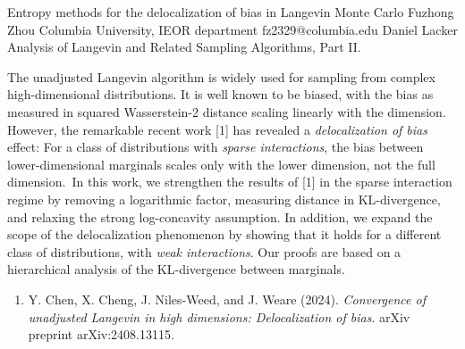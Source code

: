 \begin{talk}
  {Entropy methods for the delocalization of bias in Langevin Monte Carlo}%
  {Fuzhong Zhou}%
  {Columbia University, IEOR department}%
  {fz2329@columbia.edu}%
  {Daniel Lacker}%
  {Analysis of
   Langevin and Related Sampling Algorithms, Part II.}%
    
   
The unadjusted Langevin algorithm is widely used for sampling from complex high-dimensional distributions. It is well known to be biased, with the bias as measured in squared Wasserstein-2 distance scaling linearly with the dimension. However, the remarkable recent work [1] has revealed a \textit{delocalization of bias} effect: For a class of distributions with \textit{sparse interactions}, the bias between lower-dimensional marginals scales only with the lower dimension, not the full dimension. In this work, we strengthen the results of [1] in the sparse interaction regime by removing a logarithmic factor, measuring distance in KL-divergence, and relaxing the strong log-concavity assumption. In addition, we expand the scope of the delocalization phenomenon by showing that it holds for a different class of distributions, with \textit{weak interactions}. Our proofs are based on a hierarchical analysis of the KL-divergence between marginals.



\medskip



\begin{enumerate}
 \item[{[1]}] Y. Chen, X. Cheng, J. Niles-Weed, and J. Weare (2024). {\it Convergence of unadjusted Langevin in high dimensions: Delocalization of bias}. arXiv preprint arXiv:2408.13115.
\end{enumerate}


\end{talk}

